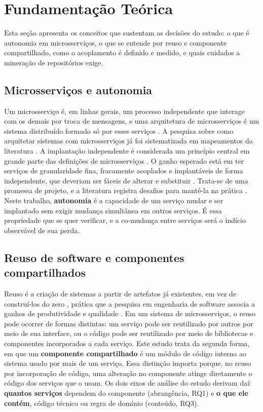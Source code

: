 \section{Fundamentação Teórica}
\label{sec:fundamentacao}

Esta seção apresenta os conceitos que sustentam as decisões do estudo: o que é autonomia em microsserviços, o que se entende por reuso e componente compartilhado, como o acoplamento é definido e medido, e quais cuidados a mineração de repositórios exige.

\subsection{Microsserviços e autonomia}

Um microsserviço é, em linhas gerais, um processo independente que interage com os demais por troca de mensagens, e uma arquitetura de microsserviços é um sistema distribuído formado só por esses serviços \cite{dragoni2017}. A pesquisa sobre como arquitetar sistemas com microsserviços já foi sistematizada em mapeamentos da literatura \cite{difrancesco2019}. A implantação independente é considerada um princípio central em grande parte das definições de microsserviços \cite{neri2019}. O ganho esperado está em ter serviços de granularidade fina, fracamente acoplados e implantáveis de forma independente, que deveriam ser fáceis de alterar e substituir \cite{bogner2021}. Trata-se de uma promessa de projeto, e a literatura registra desafios para mantê-la na prática \cite{jamshidi2018}. Neste trabalho, \textbf{autonomia} é a capacidade de um serviço mudar e ser implantado sem exigir mudança simultânea em outros serviços. É essa propriedade que se quer verificar, e a co-mudança entre serviços será o indício observável de sua perda.

\subsection{Reuso de software e componentes compartilhados}

Reuso é a criação de sistemas a partir de artefatos já existentes, em vez de construí-los do zero \cite{krueger1992}, prática que a pesquisa em engenharia de software associa a ganhos de produtividade e qualidade \cite{frakes2005}. Em um sistema de microsserviços, o reuso pode ocorrer de formas distintas: um serviço pode ser reutilizado por outros por meio de sua interface, ou o código pode ser reutilizado por meio de bibliotecas e componentes incorporados a cada serviço. Este estudo trata da segunda forma, em que um \textbf{componente compartilhado} é um módulo de código interno ao sistema usado por mais de um serviço. Essa distinção importa porque, no reuso por incorporação de código, uma alteração no componente atinge diretamente o código dos serviços que o usam. Os dois eixos de análise do estudo derivam daí: \textbf{quantos serviços} dependem do componente (abrangência, RQ1) e \textbf{o que ele contém}, código técnico ou regra de domínio (conteúdo, RQ3).

